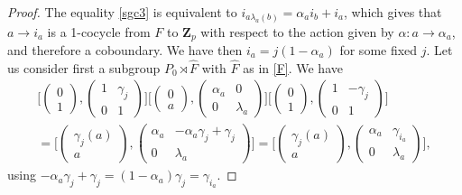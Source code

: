 \documentclass[12pt]{article}
\theoremstyle{definition}
\newcommand{\Z}{\mathbf Z}
\begin{document}
\begin{proof}
 The equality \eqref{sgc3} is equivalent to $i_{a\lambda_a(b)}=\alpha_a i_b+i_a$, which gives that $a \to i_a$ is a 1-cocycle from $F$ to $\Z_p$ with respect to the action given by $\alpha\colon a\to\alpha_a$, and therefore
 a coboundary. We have then $i_a=j(1-\alpha_a)$ for some fixed $j$. Let us consider first a subgroup $P_0\rtimes \hat F$ with $\hat F$ as in \eqref{F}. We have
		$$\begin{array}{l}
		\Big[\begin{pmatrix}
		0\\
		1
		\end{pmatrix},\begin{pmatrix}
		1 & \gamma_j\\
		0&1
		\end{pmatrix}\Big]\Big[\begin{pmatrix}
		0\\
		a
		\end{pmatrix},\begin{pmatrix}
		\alpha_a & 0\\
		0&\lambda_a
		\end{pmatrix}\Big]
\Big[\begin{pmatrix}
		0\\
		1
		\end{pmatrix},\begin{pmatrix}
		1 & -\gamma_j\\
		0&1
		\end{pmatrix}\Big]\\[12pt]
=\Big[\begin{pmatrix}
		\gamma_j(a)\\
		a
		\end{pmatrix},\begin{pmatrix}
		\alpha_a & -\alpha_a\gamma_j+\gamma_j\\
		0&\lambda_a
		\end{pmatrix}\Big]
=\Big[\begin{pmatrix}
		\gamma_j(a)\\
		a
		\end{pmatrix},\begin{pmatrix}
		\alpha_a & \gamma_{i_a}\\
		0&\lambda_a
		\end{pmatrix}\Big],
\end{array}
		$$
using $-\alpha_a\gamma_j+\gamma_j=(1-\alpha_a)\gamma_j=\gamma_{i_a}$.


\end{proof}
\end{document}
